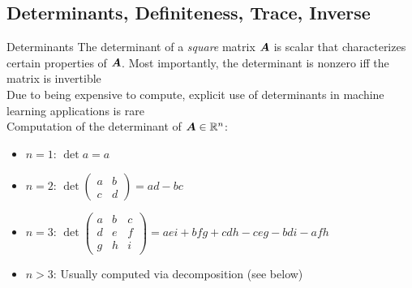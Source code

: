 \subsection{Determinants, Definiteness, Trace, Inverse}

\begin{frame}{Determinants}
    The determinant of a \emph{square} matrix $\bm{A}$ is scalar that characterizes certain properties of $\bm{A}$.
    Most importantly, the determinant is nonzero iff the matrix is invertible\\[5mm]

    Due to being expensive to compute, explicit use of determinants in machine learning applications is rare\\[5mm]

    Computation of the determinant of $\bm{A} \in \mathbb{R}^n$:
    \begin{itemize}
        \item $n = 1$: $\det a = a$
        \item $n = 2$: $\det \begin{pmatrix} a & b\\c & d \end{pmatrix}=ad-bc$
        \item $n = 3$: $\det \begin{pmatrix} a & b & c \\ d & e & f \\ g & h & i \end{pmatrix}= aei + bfg + cdh - ceg - bdi - afh$
        \item $n > 3$: Usually computed via decomposition (see below)
    \end{itemize}
\end{frame}

